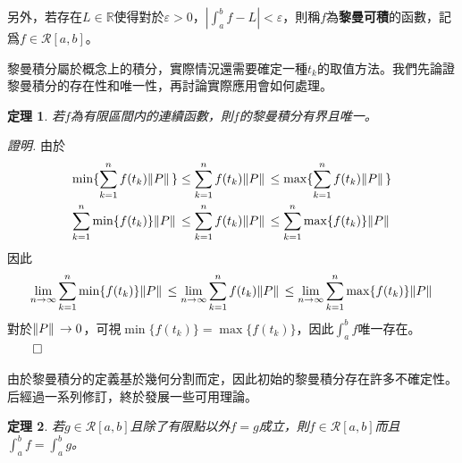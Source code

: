 \documentclass[12pt]{article}
\newtheorem*{theorem}{定理}
\renewenvironment*{proof}{\textit{證明.}}{\hfill$\qed$}
\begin{document}
    另外，若存在$L\in \mathbb{R}$使得對於$\varepsilon>0$，$|\int_a^b f - L| < \varepsilon$，則稱$f$為\textbf{黎曼可積}的函數，記爲$f\in\mathcal{R}[a,b]$。

    黎曼積分屬於概念上的積分，實際情況還需要確定一種$t_k$的取值方法。我們先論證黎曼積分的存在性和唯一性，再討論實際應用會如何處理。

    \begin{theorem}
        若$f$為有限區間内的連續函數，則$f$的黎曼積分有界且唯一。
    \end{theorem}
    \begin{proof}
        由於\begin{align*}
            \min\{\sum_{k=1}^{n}f(t_k)\norm*{P}\}\leq \sum_{k=1}^{n}f(t_k)\norm*{P}\leq \max\{\sum_{k=1}^{n}f(t_k)\norm*{P}\}\\
            \sum_{k=1}^{n}\min\{f(t_k)\}\norm*{P}\leq \sum_{k=1}^{n}f(t_k)\norm*{P}\leq \sum_{k=1}^{n}\max\{f(t_k)\}\norm*{P}
        \end{align*}
        因此\begin{align*}
            \lim_{n\to\infty}\sum_{k=1}^{n}\min\{f(t_k)\}\norm*{P}\leq \lim_{n\to\infty}\sum_{k=1}^{n}f(t_k)\norm*{P}\leq \lim_{n\to\infty}\sum_{k=1}^{n}\max\{f(t_k)\}\norm*{P}
        \end{align*}
        對於$\norm*{P}\to 0$，可視$\min\{f(t_k)\}=\max\{f(t_k)\}$，因此$\int_{a}^{b}f$唯一存在。
    \end{proof}

    由於黎曼積分的定義基於幾何分割而定，因此初始的黎曼積分存在許多不確定性。后經過一系列修訂，終於發展一些可用理論。

    \begin{theorem}
        若$g\in\mathcal{R}[a,b]$且除了有限點以外$f=g$成立，則$f\in\mathcal{R}[a,b]$而且$\int_a^b f = \int_a^b g$。
    \end{theorem}
\end{document}
